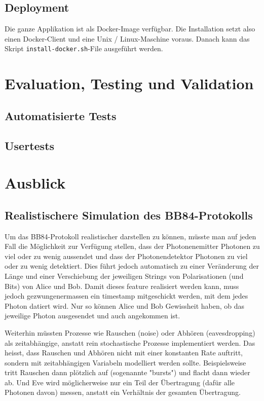 \documentclass[a4paper,10.2pt,pdftex]{scrartcl}%
\begin{document}
\subsection{Deployment}
Die ganze Applikation ist als Docker-Image verfügbar. Die Installation setzt also einen Docker-Client und eine Unix / Linux-Maschine voraus. Danach kann das Skript \texttt{install-docker.sh}-File ausgeführt werden. 

\section{Evaluation, Testing und Validation}
\subsection{Automatisierte Tests}
\subsection{Usertests}
\section{Ausblick}
\subsection{ Realistischere Simulation des BB84-Protokolls}

Um das BB84-Protokoll realistischer darstellen zu können, müsste man auf jeden Fall die Möglichkeit zur Verfügung stellen, dass der Photonenemitter Photonen zu viel oder zu wenig aussendet und dass der Photonendetektor Photonen zu viel oder zu wenig detektiert. Dies führt jedoch automatisch zu einer Veränderung der Länge und einer Verschiebung der jeweiligen Strings von Polarisationen (und Bits) von Alice und Bob. Damit dieses feature realisiert werden kann, muss jedoch gezwungenermassen ein timestamp mitgeschickt werden, mit dem jedes Photon datiert wird. Nur so können Alice und Bob Gewissheit haben, ob das jeweilige Photon ausgesendet und auch angekommen ist.

Weiterhin müssten Prozesse wie Rauschen (noise) oder Abhören (eavesdropping) als zeitabhängige, anstatt rein stochastische Prozesse implementiert werden. Das heisst, dass Rauschen und Abhören nicht mit einer konstanten Rate auftritt, sondern mit zeitabhängigen Variabeln modelliert werden sollte. Beispielsweise tritt Rauschen dann plötzlich auf (sogenannte "bursts") und flacht dann wieder ab. Und Eve wird möglicherweise nur ein Teil der Übertragung (dafür alle Photonen davon) messen, anstatt ein Verhältnis der gesamten Übertragung.
\end{document}

